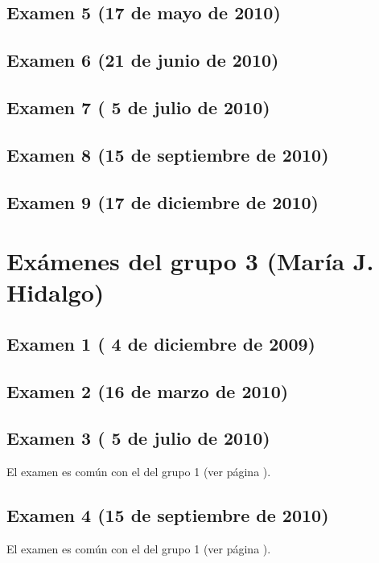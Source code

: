 \documentclass[a4paper,12pt,twoside]{book}
\begin{document}
\subsection{Examen 5 (17 de mayo de 2010)}
\subsection{Examen 6 (21 de junio de 2010)}
\subsection{Examen 7 ( 5 de julio de 2010)}
\label{examen_09_10_1_7}
\subsection{Examen 8 (15 de septiembre de 2010)}
\label{examen_09_10_1_8}
\subsection{Examen 9 (17 de diciembre de 2010)}
\label{examen_09_10_1_9}

\section{Exámenes del grupo 3 (María J. Hidalgo)}
\subsection{Examen 1 ( 4 de diciembre de 2009)}
\subsection{Examen 2 (16 de marzo de 2010)}
\subsection{Examen 3 ( 5 de julio de 2010)}
El examen es común con el del grupo 1 (ver página \pageref{examen_09_10_1_7}).
\subsection{Examen 4 (15 de septiembre de 2010)}
El examen es común con el del grupo 1 (ver página \pageref{examen_09_10_1_8}).
\end{document}

